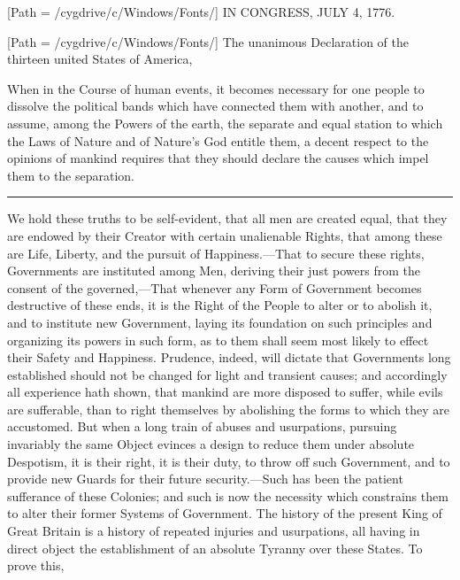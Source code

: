 \documentclass{article}
\begin{document}
\begin{center}
[Path = /cygdrive/c/Windows/Fonts/] %
\Huge{}I\huge{}N \Huge CONGRESS, J\huge{}ULY \Huge 4, 1776.
\end{center}

\noindent{}[Path = /cygdrive/c/Windows/Fonts/]
\LARGE The unanimous Declaration \normalsize of the thirteen united
\LARGE States of America,

\vspace{1.5ex}

\large When \normalsize \rmfamily in the Course of human events, it
becomes necessary for one people to dissolve the political bands which
have connected them with another, and to assume, among the Powers of
the earth, the separate and equal station to which the Laws of Nature
and of Nature's God entitle them, a decent respect to the opinions of
mankind requires that they should declare the causes which impel them
to the separation.\rule[.5ex]{4em}{.2pt}We hold these truths to be
self-evident, that all men are created equal, that they are endowed by
their Creator with certain unalienable Rights, that among these are
Life, Liberty, and the pursuit of Happiness.---That to secure these
rights, Governments are instituted among Men, deriving their just
powers from the consent of the governed,---That whenever any Form of
Government becomes destructive of these ends, it is the Right of the
People to alter or to abolish it, and to institute new Government,
laying its foundation on such principles and organizing its powers in
such form, as to them shall seem most likely to effect their Safety
and Happiness. Prudence, indeed, will dictate that Governments long
established should not be changed for light and transient causes; and
accordingly all experience hath shown, that mankind are more disposed
to suffer, while evils are sufferable, than to right themselves by
abolishing the forms to which they are accustomed. But when a long
train of abuses and usurpations, pursuing invariably the same Object
evinces a design to reduce them under absolute Despotism, it is their
right, it is their duty, to throw off such Government, and to provide
new Guards for their future security.---Such has been the patient
sufferance of these Colonies; and such is now the necessity which
constrains them to alter their former Systems of Government. The
history of the present King of Great Britain is a history of repeated
injuries and usurpations, all having in direct object the
establishment of an absolute Tyranny over these States. To prove this,
\end{document}
